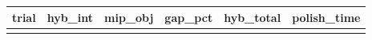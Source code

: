 \begin{tabular}{lrrrrr}
\hline
trial & hyb_int & mip_obj & gap_pct & hyb_total & polish_time \\ \hline
 &  &  &  &  &  \\
\hline
\end{tabular}
